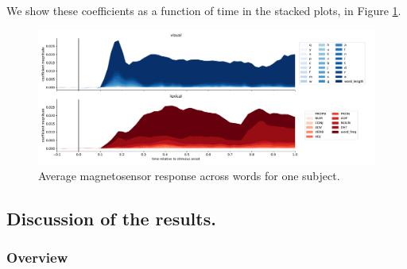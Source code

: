 We show these coefficients as a function of time in the stacked plots, in Figure
\ref{fig:megresult}.

\begin{figure}
  \centering
  \includegraphics[width=\textwidth, trim=1.5cm 1cm 0.5cm 0cm,
clip=True]{meg_result.pdf}
  \caption{Average magnetosensor response across words for one subject.}
  \label{fig:megresult}
\end{figure}


\subsection{Discussion of the results.}

\subsubsection{Overview}
